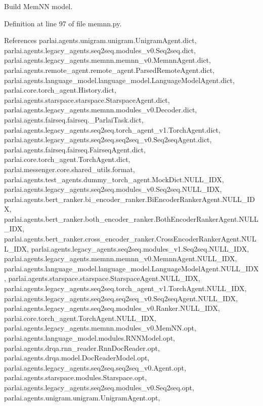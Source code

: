 \begin{DoxyVerb}Build MemNN model.\end{DoxyVerb}
 

Definition at line 97 of file memnn.\+py.



References parlai.\+agents.\+unigram.\+unigram.\+Unigram\+Agent.\+dict, parlai.\+agents.\+legacy\+\_\+agents.\+seq2seq.\+modules\+\_\+v0.\+Seq2seq.\+dict, parlai.\+agents.\+legacy\+\_\+agents.\+memnn.\+memnn\+\_\+v0.\+Memnn\+Agent.\+dict, parlai.\+agents.\+remote\+\_\+agent.\+remote\+\_\+agent.\+Parsed\+Remote\+Agent.\+dict, parlai.\+agents.\+language\+\_\+model.\+language\+\_\+model.\+Language\+Model\+Agent.\+dict, parlai.\+core.\+torch\+\_\+agent.\+History.\+dict, parlai.\+agents.\+starspace.\+starspace.\+Starspace\+Agent.\+dict, parlai.\+agents.\+legacy\+\_\+agents.\+memnn.\+modules\+\_\+v0.\+Decoder.\+dict, parlai.\+agents.\+fairseq.\+fairseq.\+\_\+\+Parlai\+Task.\+dict, parlai.\+agents.\+legacy\+\_\+agents.\+seq2seq.\+torch\+\_\+agent\+\_\+v1.\+Torch\+Agent.\+dict, parlai.\+agents.\+legacy\+\_\+agents.\+seq2seq.\+seq2seq\+\_\+v0.\+Seq2seq\+Agent.\+dict, parlai.\+agents.\+fairseq.\+fairseq.\+Fairseq\+Agent.\+dict, parlai.\+core.\+torch\+\_\+agent.\+Torch\+Agent.\+dict, parlai.\+messenger.\+core.\+shared\+\_\+utils.\+format, parlai.\+agents.\+test\+\_\+agents.\+dummy\+\_\+torch\+\_\+agent.\+Mock\+Dict.\+N\+U\+L\+L\+\_\+\+I\+DX, parlai.\+agents.\+legacy\+\_\+agents.\+seq2seq.\+modules\+\_\+v0.\+Seq2seq.\+N\+U\+L\+L\+\_\+\+I\+DX, parlai.\+agents.\+bert\+\_\+ranker.\+bi\+\_\+encoder\+\_\+ranker.\+Bi\+Encoder\+Ranker\+Agent.\+N\+U\+L\+L\+\_\+\+I\+DX, parlai.\+agents.\+bert\+\_\+ranker.\+both\+\_\+encoder\+\_\+ranker.\+Both\+Encoder\+Ranker\+Agent.\+N\+U\+L\+L\+\_\+\+I\+DX, parlai.\+agents.\+bert\+\_\+ranker.\+cross\+\_\+encoder\+\_\+ranker.\+Cross\+Encoder\+Ranker\+Agent.\+N\+U\+L\+L\+\_\+\+I\+DX, parlai.\+agents.\+legacy\+\_\+agents.\+seq2seq.\+modules\+\_\+v1.\+Seq2seq.\+N\+U\+L\+L\+\_\+\+I\+DX, parlai.\+agents.\+legacy\+\_\+agents.\+memnn.\+memnn\+\_\+v0.\+Memnn\+Agent.\+N\+U\+L\+L\+\_\+\+I\+DX, parlai.\+agents.\+language\+\_\+model.\+language\+\_\+model.\+Language\+Model\+Agent.\+N\+U\+L\+L\+\_\+\+I\+DX, parlai.\+agents.\+starspace.\+starspace.\+Starspace\+Agent.\+N\+U\+L\+L\+\_\+\+I\+DX, parlai.\+agents.\+legacy\+\_\+agents.\+seq2seq.\+torch\+\_\+agent\+\_\+v1.\+Torch\+Agent.\+N\+U\+L\+L\+\_\+\+I\+DX, parlai.\+agents.\+legacy\+\_\+agents.\+seq2seq.\+seq2seq\+\_\+v0.\+Seq2seq\+Agent.\+N\+U\+L\+L\+\_\+\+I\+DX, parlai.\+agents.\+legacy\+\_\+agents.\+seq2seq.\+modules\+\_\+v0.\+Ranker.\+N\+U\+L\+L\+\_\+\+I\+DX, parlai.\+core.\+torch\+\_\+agent.\+Torch\+Agent.\+N\+U\+L\+L\+\_\+\+I\+DX, parlai.\+agents.\+legacy\+\_\+agents.\+memnn.\+modules\+\_\+v0.\+Mem\+N\+N.\+opt, parlai.\+agents.\+language\+\_\+model.\+modules.\+R\+N\+N\+Model.\+opt, parlai.\+agents.\+drqa.\+rnn\+\_\+reader.\+Rnn\+Doc\+Reader.\+opt, parlai.\+agents.\+drqa.\+model.\+Doc\+Reader\+Model.\+opt, parlai.\+agents.\+legacy\+\_\+agents.\+seq2seq.\+seq2seq\+\_\+v0.\+Agent.\+opt, parlai.\+agents.\+starspace.\+modules.\+Starspace.\+opt, parlai.\+agents.\+legacy\+\_\+agents.\+seq2seq.\+modules\+\_\+v0.\+Seq2seq.\+opt, parlai.\+agents.\+unigram.\+unigram.\+Unigram\+Agent.\+opt, 